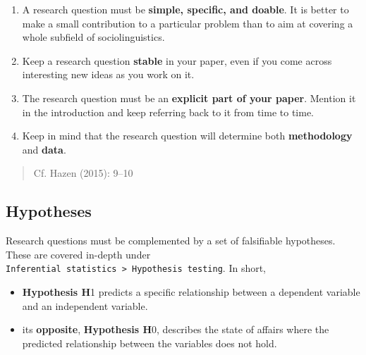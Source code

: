 \documentclass[
  11pt,
  letterpaper,
  DIV=11,
  numbers=noendperiod]{scrreprt}
\begin{document}
\begin{tcolorbox}[enhanced jigsaw, toprule=.15mm, opacitybacktitle=0.6, coltitle=black, arc=.35mm, colback=white, title=\textcolor{quarto-callout-tip-color}{\faLightbulb}\hspace{0.5em}{Tip}, titlerule=0mm, toptitle=1mm, bottomtitle=1mm, breakable, rightrule=.15mm, opacityback=0, bottomrule=.15mm, leftrule=.75mm, colframe=quarto-callout-tip-color-frame, left=2mm, colbacktitle=quarto-callout-tip-color!10!white]

\begin{enumerate}
\def\labelenumi{\arabic{enumi}.}
\item
  A research question must be \textbf{simple, specific, and doable}. It
  is better to make a small contribution to a particular problem than to
  aim at covering a whole subfield of sociolinguistics.
\item
  Keep a research question \textbf{stable} in your paper, even if you
  come across interesting new ideas as you work on it.
\item
  The research question must be an \textbf{explicit part of your paper}.
  Mention it in the introduction and keep referring back to it from time
  to time.
\item
  Keep in mind that the research question will determine both
  \textbf{methodology} and \textbf{data}.
\end{enumerate}

\begin{quote}
Cf. Hazen (2015): 9--10
\end{quote}

\end{tcolorbox}

\subsection{Hypotheses}\label{hypotheses}

Research questions must be complemented by a set of falsifiable
hypotheses. These are covered in-depth under
\texttt{Inferential\ statistics\ \textgreater{}\ Hypothesis\ testing}.
In short,

\begin{itemize}
\item
  \textbf{Hypothesis H}1 predicts a specific relationship between a
  dependent variable and an independent variable.
\item
  its \textbf{opposite}, \textbf{Hypothesis H}0, describes the state of
  affairs where the predicted relationship between the variables does
  not hold.
\end{itemize}
\end{document}
